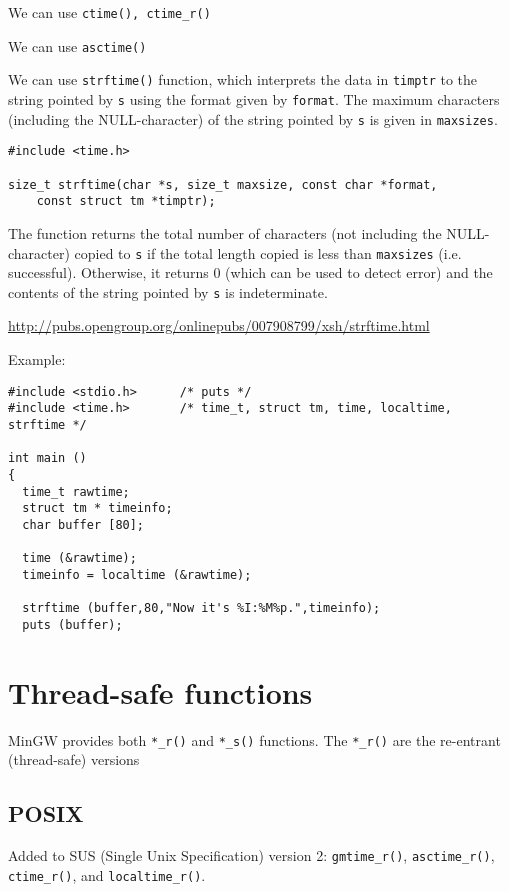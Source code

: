 We can use \verb!ctime(), ctime_r()! 

We can use \verb!asctime()!

We can use \verb!strftime()! function, which interprets the data in
\verb!timptr! to the string pointed by \verb!s! using the format given by
\verb!format!. The maximum characters (including the NULL-character) of the
string pointed by \verb!s! is given in \verb!maxsizes!.
\begin{verbatim}
#include <time.h>

size_t strftime(char *s, size_t maxsize, const char *format,
    const struct tm *timptr);
\end{verbatim}
The function returns the total number of characters (not including the
NULL-character) copied to \verb!s! if the total length copied is less than
\verb!maxsizes! (i.e. successful). Otherwise, it returns 0 (which can be used
to detect error) and the contents of the string pointed by \verb!s! is
indeterminate.

\url{http://pubs.opengroup.org/onlinepubs/007908799/xsh/strftime.html}


Example:
\begin{Verbatim}
#include <stdio.h>      /* puts */
#include <time.h>       /* time_t, struct tm, time, localtime, strftime */

int main ()
{
  time_t rawtime;
  struct tm * timeinfo;
  char buffer [80];

  time (&rawtime);
  timeinfo = localtime (&rawtime);

  strftime (buffer,80,"Now it's %I:%M%p.",timeinfo);
  puts (buffer);

\end{Verbatim}


\section{Thread-safe functions}

MinGW provides both \verb!*_r()! and \verb!*_s()! functions. The \verb!*_r()!
are the re-entrant (thread-safe) versions

\subsection{POSIX}

Added to SUS (Single Unix Specification) version 2: \verb!gmtime_r()!,
\verb!asctime_r()!, \verb!ctime_r()!, and \verb!localtime_r()!.


